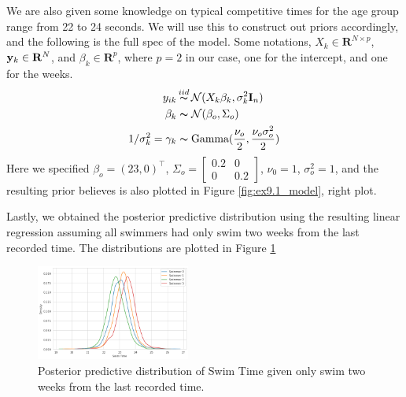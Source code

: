 \documentclass[11pt, letterpaper]{article}
\begin{document}
We are also given some knowledge on typical competitive times for the age group range from 22 to 24 seconds. We will use this to construct out priors accordingly, and the following is the full spec of the model. Some notations, $X_{k} \in \mathbf{R}^{N\times p}$, $\bold{y}_k \in \mathbf{R}^N$, and $\beta_k \in \mathbf{R}^p$, where $p = 2$ in our case, one for the intercept, and one for the weeks.
\begin{align*}
    y_{ik} &\mathop{\thicksim}^{iid} \mathcal{N}(X_k \beta_k, \sigma_k^2 \mathbf{I}_n) \\
    \beta_k &\thicksim \mathcal{N}(\beta_o, \Sigma_o) \\
    1/\sigma^2_k = \gamma_k &\thicksim \text{Gamma}(\frac{\nu_o}{2}, \frac{\nu_o\sigma^2_o}{2})
\end{align*}
Here we specified $\beta_o = (23, 0)^{\intercal}$, $\Sigma_o = \begin{bmatrix}0.2 & 0 \\ 0 & 0.2\end{bmatrix}$, $\nu_0 = 1$, $\sigma^2_o = 1$, and the resulting prior believes is also plotted in Figure \ref{fig:ex9.1_model}, right plot.

\newpage
Lastly, we obtained the posterior predictive distribution using the resulting linear regression assuming all swimmers had only swim two weeks from the last recorded time. The distributions are plotted in Figure \ref{fig:ex9.1_pp}
\begin{figure}[!h]
  \centering
  \includegraphics[width=0.45\textwidth]{1.3.png}
  \captionsetup{justification=centering}
  \caption{Posterior predictive distribution of Swim Time given only swim two weeks from the last recorded time.}
  \label{fig:ex9.1_pp}
\end{figure}
\end{document}

